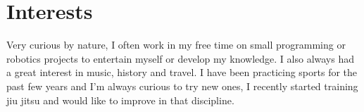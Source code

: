 \documentclass[letterpaper]{twentysecondcv - EN} %
\begin{document}

\section{Interests}

Very curious by nature, I often work in my free time on small programming or robotics projects to entertain myself or develop my knowledge. I also always had a great interest in music, history and travel. I have been practicing sports for the past few years and I'm always curious to try new ones, I recently started training jiu jitsu and would like to improve in that discipline.
\end{document}
